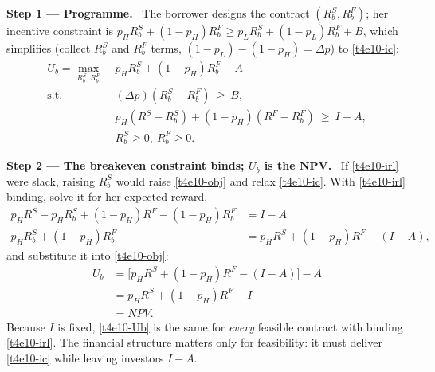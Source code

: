 \documentclass[11pt,a4paper]{article}
\newcommand{\step}[2]{\par\medskip\noindent\textbf{Step #1 --- #2.}~}
\begin{document}
\step{1}{Programme} The borrower designs the contract $(R_b^S,R_b^F)$; her incentive constraint is
$p_HR_b^S+(1-p_H)R_b^F\ge p_LR_b^S+(1-p_L)R_b^F+B$, which simplifies (collect $R_b^S$ and $R_b^F$
terms, $(1-p_L)-(1-p_H)=\Delta p$) to \eqref{t4e10-ic}:
\begin{align}
  U_b=\max_{R_b^S,R_b^F}\; & p_HR_b^S+(1-p_H)R_b^F-A \label{t4e10-obj}\\
  \text{s.t. }\; & (\Delta p)(R_b^S-R_b^F)\ \ge\ B, \tag{IC$_b$}\label{t4e10-ic}\\
  & p_H(R^S-R_b^S)+(1-p_H)(R^F-R_b^F)\ \ge\ I-A, \tag{IR$_l$}\label{t4e10-irl}\\
  & R_b^S\ge0,\ R_b^F\ge0. \tag{LL}\label{t4e10-ll}
\end{align}

\step{2}{The breakeven constraint binds; $U_b$ is the NPV} If \eqref{t4e10-irl} were slack, raising
$R_b^S$ would raise \eqref{t4e10-obj} and relax \eqref{t4e10-ic}. With \eqref{t4e10-irl} binding,
solve it for her expected reward,
\begin{align}
  p_HR^S-p_HR_b^S+(1-p_H)R^F-(1-p_H)R_b^F &= I-A \nonumber\\
  p_HR_b^S+(1-p_H)R_b^F &= p_HR^S+(1-p_H)R^F-(I-A), \nonumber
\end{align}
and substitute it into \eqref{t4e10-obj}:
\begin{align}
  U_b &= \big[p_HR^S+(1-p_H)R^F-(I-A)\big]-A \nonumber\\
      &= p_HR^S+(1-p_H)R^F-I \nonumber\\
      &= \mathit{NPV}. \label{t4e10-Ub}
\end{align}
Because $I$ is fixed, \eqref{t4e10-Ub} is the same for \emph{every} feasible contract with binding
\eqref{t4e10-irl}. The financial structure matters only for feasibility: it must deliver
\eqref{t4e10-ic} while leaving investors $I-A$.
\end{document}
